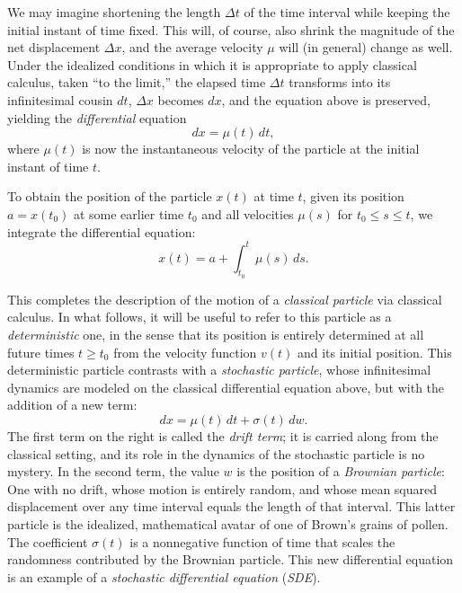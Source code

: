 \documentclass[11pt]{book}
\theoremstyle{definition}
\numberwithin{equation}{section}
\begin{document}
We may imagine shortening the length $\Delta t$ of the time interval while keeping the initial instant of time fixed. This will, of course, also shrink the magnitude of the net displacement $\Delta x$, and the average velocity $\mu$ will (in general) change as well. Under the idealized conditions in which it is appropriate to apply classical calculus, taken ``to the limit,'' the elapsed time $\Delta t$ transforms into its infinitesimal cousin $dt$, $\Delta x$ becomes $dx$, and the equation above is preserved, yielding the \textit{differential} equation
\begin{equation} \label{eqn:classic-diff-eq}
	dx = \mu(t) \, dt,
\end{equation}
where $\mu(t)$ is now the instantaneous velocity of the particle at the initial instant of time $t$.

To obtain the position of the particle $x(t)$ at time $t$, given its position $a = x(t_0)$ at some earlier time $t_0$ and all velocities $\mu(s)$ for $t_0 \leq s \leq t$, we integrate the differential equation:
\[
	x(t) = a + \int_{t_0}^t \mu(s) \, ds.
\]

This completes the description of the motion of a \textit{classical particle} via classical calculus. In what follows, it will be useful to refer to this particle as a \textit{deterministic} one, in the sense that its position is entirely determined at all future times $t\geq t_0$ from the velocity function $v(t)$ and its initial position. This deterministic particle contrasts with a \textit{stochastic particle}, whose infinitesimal dynamics are modeled on the classical differential equation above, but with the addition of a new term:
\begin{equation} \label{eqn:stochastic-diff-eq}
	dx = \mu(t) \, dt + \sigma(t) \, dw.
\end{equation}
The first term on the right is called the \textit{drift term}; it is carried along from the classical setting, and its role in the dynamics of the stochastic particle is no mystery. In the second term, the value $w$ is the position of a \textit{Brownian particle}: One with no drift, whose motion is entirely random, and whose mean squared displacement over any time interval equals the length of that interval. This latter particle is the idealized, mathematical avatar of one of Brown's grains of pollen. The coefficient $\sigma(t)$ is a nonnegative function of time that scales the randomness contributed by the Brownian particle. This new differential equation is an example of a \textit{stochastic differential equation} (\textit{SDE}).
\end{document}
